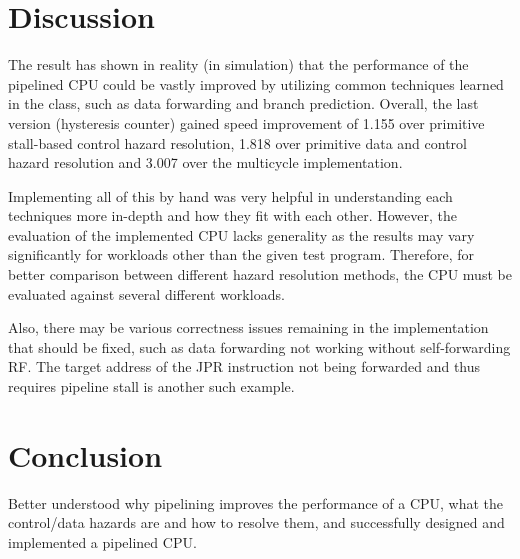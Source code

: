 \documentclass[12pt]{article}
\begin{document}
\section{Discussion}
The result has shown in reality (in simulation) that the performance
of the pipelined CPU could be vastly improved by utilizing common
techniques learned in the class, such as data forwarding and branch
prediction. Overall, the last version (hysteresis counter) gained
speed improvement of 1.155 over primitive stall-based control hazard
resolution, 1.818 over primitive data and control hazard resolution
and 3.007 over the multicycle implementation.

Implementing all of this by hand was very helpful in understanding
each techniques more in-depth and how they fit with each other.
However, the evaluation of the implemented CPU lacks generality as the
results may vary significantly for workloads other than the given test
program.  Therefore, for better comparison between different hazard
resolution methods, the CPU must be evaluated against several
different workloads.

Also, there may be various correctness issues remaining in the
implementation that should be fixed, such as data forwarding not
working without self-forwarding RF.  The target address of the JPR
instruction not being forwarded and thus requires pipeline stall is
another such example.

\section{Conclusion}
Better understood why pipelining improves the performance of a CPU,
what the control/data hazards are and how to resolve them, and
successfully designed and implemented a pipelined CPU.
\end{document}
